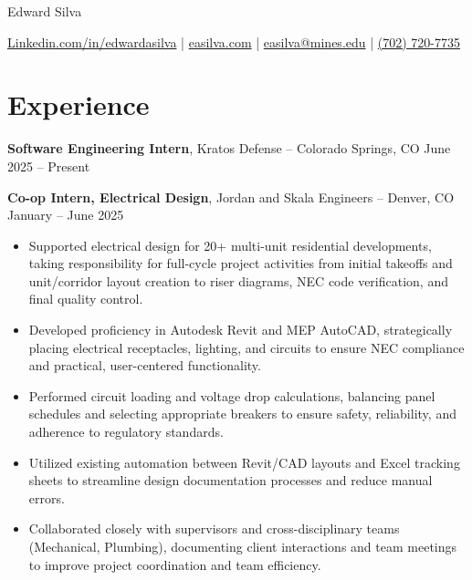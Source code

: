 \documentclass[11pt]{article}       %
\begin{document}
\centerline{\huge Edward Silva}
\vspace{5pt}

\centerline{
\href{https://www.linkedin.com/in/edwardasilva/}{Linkedin.com/in/edwardasilva}
| \href{https://easilva.com}{easilva.com}
| \href{mailto:easilva@mines.edu}{easilva@mines.edu} 
| \href{tel:7027207735}{(702) 720-7735}
}

\vspace{-12pt}
\section*{Experience}
\vspace{3pt}

\textbf{Software Engineering Intern}, Kratos Defense -- Colorado Springs, CO \hfill June 2025 -- Present
\vspace{6pt}

\textbf{Co-op Intern, Electrical Design}, Jordan and Skala Engineers -- Denver, CO \hfill January -- June 2025
\vspace{-6pt}
\begin{itemize}
  \item Supported electrical design for 20+ multi-unit residential developments, taking responsibility for full-cycle project activities from initial takeoffs and unit/corridor layout creation to riser diagrams, NEC code verification, and final quality control.
  \item Developed proficiency in Autodesk Revit and MEP AutoCAD, strategically placing electrical receptacles, lighting, and circuits to ensure NEC compliance and practical, user-centered functionality.
  \item Performed circuit loading and voltage drop calculations, balancing panel schedules and selecting appropriate breakers to ensure safety, reliability, and adherence to regulatory standards.
  \item Utilized existing automation between Revit/CAD layouts and Excel tracking sheets to streamline design documentation processes and reduce manual errors.
  \item Collaborated closely with supervisors and cross-disciplinary teams (Mechanical, Plumbing), documenting client interactions and team meetings to improve project coordination and team efficiency.
\end{itemize}

\vspace{-6pt}
\end{document}
